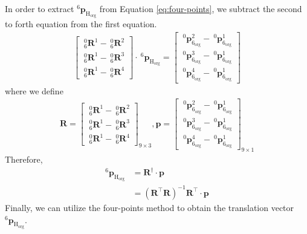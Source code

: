\newpage
\noindent
In order to extract $^\mathrm{6}\!\boldsymbol{p}_\mathrm{H_{org}}$ from Equation \ref{eq:four-points}, we subtract the second to forth equation from the first equation.
\begin{equation}
\begin{split}	
\begin{bmatrix}
\  _{\mathrm{6}}^{\mathrm{0}}\mathbf{R}^{1} - \  _{\mathrm{6}}^{\mathrm{0}}\mathbf{R}^{2}\\ 
\  _{\mathrm{6}}^{\mathrm{0}}\mathbf{R}^{1} - \  _{\mathrm{6}}^{\mathrm{0}}\mathbf{R}^{3}\\ 
\  _{\mathrm{6}}^{\mathrm{0}}\mathbf{R}^{1} - \  _{\mathrm{6}}^{\mathrm{0}}\mathbf{R}^{4}
\end{bmatrix}
\cdot\ ^\mathrm{6}\!\boldsymbol{p}_\mathrm{H_{org}}
=
\begin{bmatrix}
\ ^\mathrm{0}\!\boldsymbol{p}_\mathrm{6_{org}}^{2} -\ ^\mathrm{0}\!\boldsymbol{p}_\mathrm{6_{org}}^{1} \\ 
\ ^\mathrm{0}\!\boldsymbol{p}_\mathrm{6_{org}}^{3} -\ ^\mathrm{0}\!\boldsymbol{p}_\mathrm{6_{org}}^{1} \\ 
\ ^\mathrm{0}\!\boldsymbol{p}_\mathrm{6_{org}}^{4} -\ ^\mathrm{0}\!\boldsymbol{p}_\mathrm{6_{org}}^{1} 
\end{bmatrix}
\end{split}
\end{equation}
where we define
\begin{equation*}
\begin{split}
\mathbf{R} =  
\begin{bmatrix}
\  _{\mathrm{6}}^{\mathrm{0}}\mathbf{R}^{1} - \  _{\mathrm{6}}^{\mathrm{0}}\mathbf{R}^{2}\\ 
\  _{\mathrm{6}}^{\mathrm{0}}\mathbf{R}^{1} - \  _{\mathrm{6}}^{\mathrm{0}}\mathbf{R}^{3}\\ 
\  _{\mathrm{6}}^{\mathrm{0}}\mathbf{R}^{1} - \  _{\mathrm{6}}^{\mathrm{0}}\mathbf{R}^{4}
\end{bmatrix}_{9 \times 3}, 
\boldsymbol{p} = 
\begin{bmatrix}
\ ^\mathrm{0}\!\boldsymbol{p}_\mathrm{6_{org}}^{2} -\ ^\mathrm{0}\!\boldsymbol{p}_\mathrm{6_{org}}^{1} \\ 
\ ^\mathrm{0}\!\boldsymbol{p}_\mathrm{6_{org}}^{3} -\ ^\mathrm{0}\!\boldsymbol{p}_\mathrm{6_{org}}^{1} \\ 
\ ^\mathrm{0}\!\boldsymbol{p}_\mathrm{6_{org}}^{4} -\ ^\mathrm{0}\!\boldsymbol{p}_\mathrm{6_{org}}^{1} 
\end{bmatrix}_{9 \times 1}
\end{split}
\end{equation*}
Therefore,
\begin{equation*}
\begin{split}
^\mathrm{6}\!\boldsymbol{p}_\mathrm{H_{org}} 	&= \mathbf{R}^{\dagger} \cdot \boldsymbol{p}\\
					  							&= \left( \mathbf{R}^\top\mathbf{R}\right) ^{-1}\mathbf{R}^\top \cdot \boldsymbol{p}
\end{split}
\end{equation*}
Finally, we can utilize the four-points method to obtain the translation vector $^\mathrm{6}\!\boldsymbol{p}_\mathrm{H_{org}} $.
